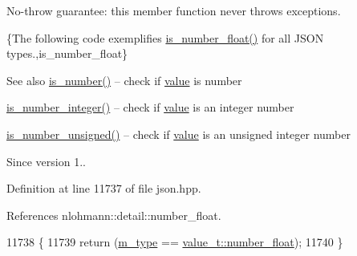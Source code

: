 No-\/throw guarantee\+: this member function never throws exceptions.

\{The following code exemplifies {\ttfamily \hyperlink{classnlohmann_1_1basic__json_a33b4bf898b857c962e798fc7f6e86e70}{is\+\_\+number\+\_\+float()}} for all J\+S\+ON types.,is\+\_\+number\+\_\+float\}

\begin{DoxySeeAlso}{See also}
\hyperlink{classnlohmann_1_1basic__json_a2b9852390abb4b1ef5fac6984e2fc0f3}{is\+\_\+number()} -- check if \hyperlink{classnlohmann_1_1basic__json_adcf8ca5079f5db993820bf50036bf45d}{value} is number 

\hyperlink{classnlohmann_1_1basic__json_abac8af76067f1e8fdca9052882c74428}{is\+\_\+number\+\_\+integer()} -- check if \hyperlink{classnlohmann_1_1basic__json_adcf8ca5079f5db993820bf50036bf45d}{value} is an integer number 

\hyperlink{classnlohmann_1_1basic__json_abc7378cba0613a78b9aad1c8e7044bb0}{is\+\_\+number\+\_\+unsigned()} -- check if \hyperlink{classnlohmann_1_1basic__json_adcf8ca5079f5db993820bf50036bf45d}{value} is an unsigned integer number
\end{DoxySeeAlso}
\begin{DoxySince}{Since}
version 1.. 
\end{DoxySince}


Definition at line 11737 of file json.\+hpp.



References nlohmann\+::detail\+::number\+\_\+float.


\begin{DoxyCode}
11738     \{
11739         \textcolor{keywordflow}{return} (\hyperlink{classnlohmann_1_1basic__json_a91990b60d7d4d67968a2c1db677536e7}{m\_type} == \hyperlink{namespacenlohmann_1_1detail_a1ed8fc6239da25abcaf681d30ace4985ad9966ecb59667235a57b4b999a649eef}{value\_t::number\_float});
11740     \}
\end{DoxyCode}
\mbox{\label{classnlohmann_1_1basic__json_abac8af76067f1e8fdca9052882c74428}} 
